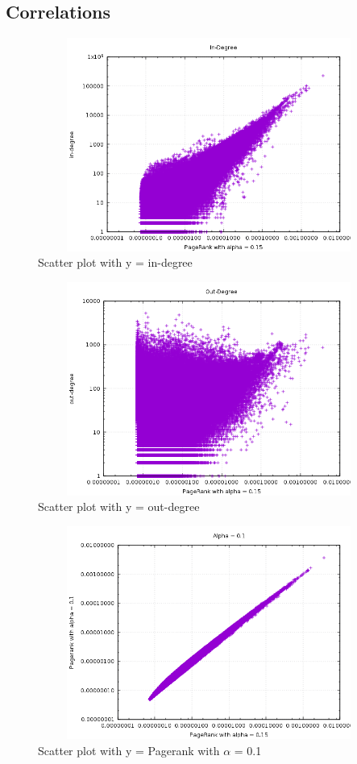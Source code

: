 \documentclass{article}
\begin{document}
\clearpage

\subsection{Correlations}
\begin{figure}[h!]
\includegraphics[width=12cm, height=7cm]{in_degree.png}
  \caption{Scatter plot with y = in-degree}
\end{figure}
\FloatBarrier
\begin{figure}[h!]
\includegraphics[width=12cm, height=7cm]{out_degree.png}
  \caption{Scatter plot with y = out-degree}
\end{figure}
\FloatBarrier
\begin{figure}[h!]
\includegraphics[width=12cm, height=7cm]{correlationPart3.png}
  \caption{Scatter plot with y = Pagerank with $\alpha$ = 0.1}
\end{figure}
\end{document}
